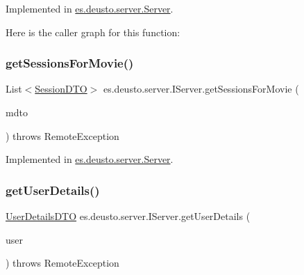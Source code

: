 Implemented in \mbox{\hyperlink{classes_1_1deusto_1_1server_1_1_server_a688ca336b3cbdb5c04ecdc4f23ff65d1}{es.\+deusto.\+server.\+Server}}.

Here is the caller graph for this function\+:
\mbox{\label{interfacees_1_1deusto_1_1server_1_1_i_server_a33dc65de2a567be10bf2477ee28765f8}} 
\subsubsection{\texorpdfstring{getSessionsForMovie()}{getSessionsForMovie()}}
{\footnotesize\ttfamily List$<$\mbox{\hyperlink{classes_1_1deusto_1_1server_1_1data_1_1_session_d_t_o}{Session\+D\+TO}}$>$ es.\+deusto.\+server.\+I\+Server.\+get\+Sessions\+For\+Movie (\begin{DoxyParamCaption}\item[{\mbox{\hyperlink{classes_1_1deusto_1_1server_1_1data_1_1_movie_d_t_o}{Movie\+D\+TO}}}]{mdto }\end{DoxyParamCaption}) throws Remote\+Exception}



Implemented in \mbox{\hyperlink{classes_1_1deusto_1_1server_1_1_server_a33a6671bb4dc4bd9e23df10e53e5632d}{es.\+deusto.\+server.\+Server}}.

\mbox{\label{interfacees_1_1deusto_1_1server_1_1_i_server_a2dcd7f0b0e157eb797e20432c0b0e971}} 
\subsubsection{\texorpdfstring{getUserDetails()}{getUserDetails()}}
{\footnotesize\ttfamily \mbox{\hyperlink{classes_1_1deusto_1_1server_1_1data_1_1_user_details_d_t_o}{User\+Details\+D\+TO}} es.\+deusto.\+server.\+I\+Server.\+get\+User\+Details (\begin{DoxyParamCaption}\item[{\mbox{\hyperlink{classes_1_1deusto_1_1server_1_1data_1_1_user_d_t_o}{User\+D\+TO}}}]{user }\end{DoxyParamCaption}) throws Remote\+Exception}



